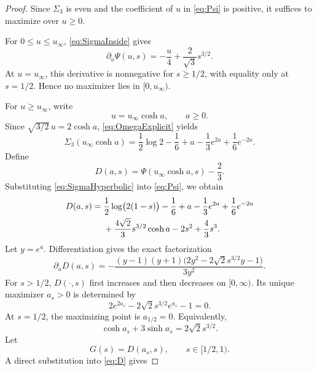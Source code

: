 \documentclass[11pt,reqno]{amsart}
\numberwithin{equation}{section}
\theoremstyle{plain}
\theoremstyle{definition}
\theoremstyle{remark}
\newcommand{\1}{\mathbf 1}
\begin{document}
\begin{proof}
Since \(\Sigma_3\) is even and the coefficient of \(u\) in \eqref{eq:Psi} is positive, it suffices to maximize over \(u\geq0\).

For \(0\leq u\leq u_\infty\), \eqref{eq:SigmaInside} gives
\begin{equation}\label{eq:derivativeInside}
 \partial_u\Psi(u,s)
 =-\frac u4+\frac2{\sqrt3}s^{3/2}.
\end{equation}
At \(u=u_\infty\), this derivative is nonnegative for \(s\geq1/2\), with equality only at \(s=1/2\).  Hence no maximizer lies in \([0,u_\infty)\).

For \(u\geq u_\infty\), write
\begin{equation}\label{eq:hyperbolic}
 u=u_\infty\cosh a,
 \qquad a\geq0.
\end{equation}
Since \(\sqrt{3/2}\,u=2\cosh a\), \eqref{eq:OmegaExplicit} yields
\begin{equation}\label{eq:SigmaHyperbolic}
 \Sigma_3(u_\infty\cosh a)
 =\frac12\log2-\frac16+a-\frac13e^{2a}+\frac16e^{-2a}.
\end{equation}
Define
\[
 D(a,s)=\Psi(u_\infty\cosh a,s)-\frac23.
\]
Substituting \eqref{eq:SigmaHyperbolic} into \eqref{eq:Psi}, we obtain
\begin{align}
 D(a,s)
 ={}&\frac12\log\bigl(2(1-s)\bigr)-\frac16+a
 -\frac13e^{2a}+\frac16e^{-2a}\notag\\
 &+\frac{4\sqrt2}{3}s^{3/2}\cosh a
 -2s^2+\frac43s^3.
 \label{eq:D}
\end{align}
Let \(y=e^a\).  Differentiation gives the exact factorization
\begin{equation}\label{eq:Dfactor}
 \partial_aD(a,s)
 =-\frac{(y-1)(y+1)\bigl(2y^2-2\sqrt2s^{3/2}y-1\bigr)}{3y^2}.
\end{equation}
For \(s>1/2\), \(D(\cdot,s)\) first increases and then decreases on \([0,\infty)\).  Its unique maximizer \(a_s>0\) is determined by
\begin{equation}\label{eq:criticala}
 2e^{2a_s}-2\sqrt2s^{3/2}e^{a_s}-1=0.
\end{equation}
At \(s=1/2\), the maximizing point is \(a_{1/2}=0\).  Equivalently,
\begin{equation}\label{eq:criticalhyperbolic}
 \cosh a_s+3\sinh a_s=2\sqrt2s^{3/2}.
\end{equation}
Let
\begin{equation}\label{eq:Gdef}
 G(s)=D(a_s,s),
 \qquad s\in[1/2,1).
\end{equation}
A direct substitution into \eqref{eq:D} gives

\end{proof}
\end{document}
